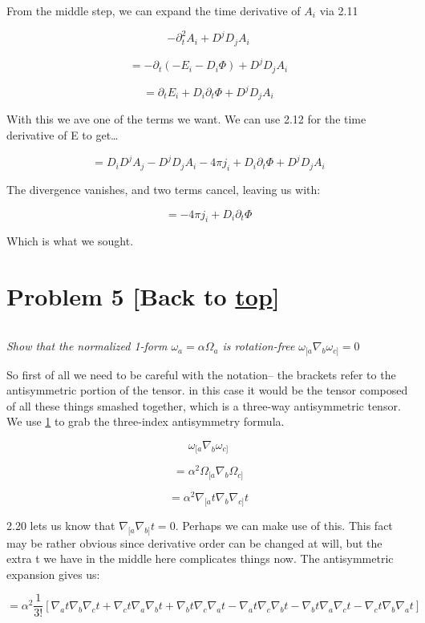 \documentclass[landscape,letterpaper,10pt,english]{article}
\begin{document}
    From the middle step, we can expand the time derivative of \(A_i\) via
2.11

\[ -\partial^2_t A_i + D^j D_j A_i \]

\[ = -\partial_t (-E_i - D_i \Phi) + D^j D_j A_i \]

\[ = \partial_tE_i + D_i \partial_t \Phi + D^j D_j A_i \]

With this we ave one of the terms we want. We can use 2.12 for the time
derivative of E to get\ldots{}

\[ = D_iD^jA_j - D^jD_jA_i - 4\pi j_i + D_i \partial_t \Phi + D^j D_j A_i \]

The divergence vanishes, and two terms cancel, leaving us with:

\[ = - 4\pi j_i + D_i \partial_t \Phi \]

Which is what we sought.

    \hypertarget{problem-5-back-to-top}{%
\section{\texorpdfstring{Problem 5 {[}Back to
\hyperref[toc]{top}{]}}{Problem 5 {[}Back to {]}}}\label{problem-5-back-to-top}}

\[\label{P5}\]

\emph{Show that the normalized 1-form \(\omega_a = \alpha\Omega_a\) is
rotation-free \(\omega_{[a} \nabla_b \omega_{c]} = 0\)}

    So first of all we need to be careful with the notation-- the brackets
refer to the antisymmetric portion of the tensor. in this case it would
be the tensor composed of all these things smashed together, which is a
three-way antisymmetric tensor. We use \hyperref[1]{1} to grab the
three-index antisymmetry formula.

\[ \omega_{[a} \nabla_b \omega_{c]} \]

\[ = \alpha^2 \Omega_{[a} \nabla_b \Omega_{c]} \]

\[ = \alpha^2 \nabla_{[a}t \nabla_b \nabla_{c]}t \]

2.20 lets us know that \(\nabla_{[a}\nabla_{b]}t = 0\). Perhaps we can
make use of this. This fact may be rather obvious since derivative order
can be changed at will, but the extra t we have in the middle here
complicates things now. The antisymmetric expansion gives us:

\[ = \alpha^2 \frac{1}{3!} \left[ \nabla_{a}t \nabla_b \nabla_{c}t + \nabla_{c}t \nabla_a \nabla_{b}t + \nabla_{b}t \nabla_c \nabla_{a}t - \nabla_{a}t \nabla_c \nabla_{b}t - \nabla_{b}t \nabla_a \nabla_{c}t - \nabla_{c}t \nabla_b \nabla_{a}t \right]\]
\end{document}

